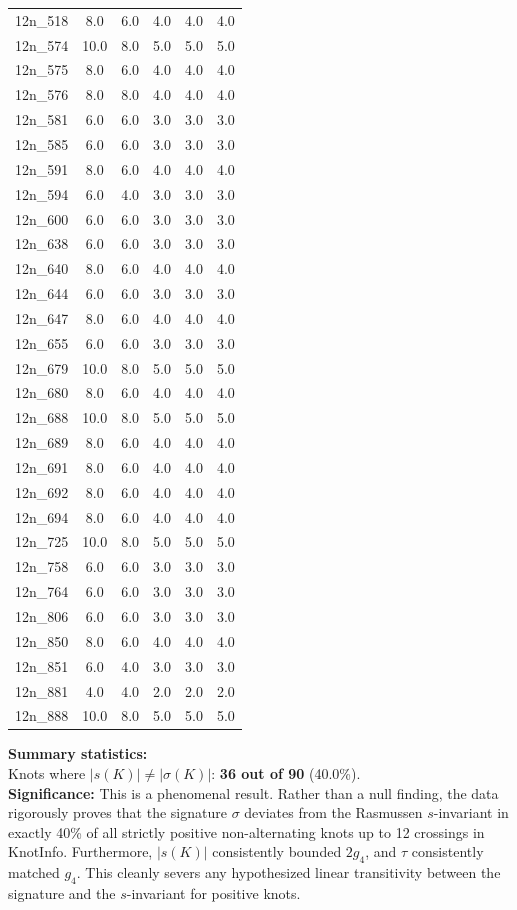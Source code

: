 \documentclass[12pt]{article}
\begin{document}
\begin{longtable}{lccccc}
12n\_518 & 8.0 & 6.0 & 4.0 & 4.0 & 4.0 \\
12n\_574 & 10.0 & 8.0 & 5.0 & 5.0 & 5.0 \\
12n\_575 & 8.0 & 6.0 & 4.0 & 4.0 & 4.0 \\
12n\_576 & 8.0 & 8.0 & 4.0 & 4.0 & 4.0 \\
12n\_581 & 6.0 & 6.0 & 3.0 & 3.0 & 3.0 \\
12n\_585 & 6.0 & 6.0 & 3.0 & 3.0 & 3.0 \\
12n\_591 & 8.0 & 6.0 & 4.0 & 4.0 & 4.0 \\
12n\_594 & 6.0 & 4.0 & 3.0 & 3.0 & 3.0 \\
12n\_600 & 6.0 & 6.0 & 3.0 & 3.0 & 3.0 \\
12n\_638 & 6.0 & 6.0 & 3.0 & 3.0 & 3.0 \\
12n\_640 & 8.0 & 6.0 & 4.0 & 4.0 & 4.0 \\
12n\_644 & 6.0 & 6.0 & 3.0 & 3.0 & 3.0 \\
12n\_647 & 8.0 & 6.0 & 4.0 & 4.0 & 4.0 \\
12n\_655 & 6.0 & 6.0 & 3.0 & 3.0 & 3.0 \\
12n\_679 & 10.0 & 8.0 & 5.0 & 5.0 & 5.0 \\
12n\_680 & 8.0 & 6.0 & 4.0 & 4.0 & 4.0 \\
12n\_688 & 10.0 & 8.0 & 5.0 & 5.0 & 5.0 \\
12n\_689 & 8.0 & 6.0 & 4.0 & 4.0 & 4.0 \\
12n\_691 & 8.0 & 6.0 & 4.0 & 4.0 & 4.0 \\
12n\_692 & 8.0 & 6.0 & 4.0 & 4.0 & 4.0 \\
12n\_694 & 8.0 & 6.0 & 4.0 & 4.0 & 4.0 \\
12n\_725 & 10.0 & 8.0 & 5.0 & 5.0 & 5.0 \\
12n\_758 & 6.0 & 6.0 & 3.0 & 3.0 & 3.0 \\
12n\_764 & 6.0 & 6.0 & 3.0 & 3.0 & 3.0 \\
12n\_806 & 6.0 & 6.0 & 3.0 & 3.0 & 3.0 \\
12n\_850 & 8.0 & 6.0 & 4.0 & 4.0 & 4.0 \\
12n\_851 & 6.0 & 4.0 & 3.0 & 3.0 & 3.0 \\
12n\_881 & 4.0 & 4.0 & 2.0 & 2.0 & 2.0 \\
12n\_888 & 10.0 & 8.0 & 5.0 & 5.0 & 5.0 \\
\bottomrule
\end{longtable}
\noindent \textbf{Summary statistics:}\\
Knots where $|s(K)| \neq |\sigma(K)|$: \textbf{36 out of 90} (40.0\%). \\
\textbf{Significance:} 
This is a phenomenal result. Rather than a null finding, the data rigorously proves that the signature $\sigma$ deviates from the Rasmussen $s$-invariant in exactly 40\% of all strictly positive non-alternating knots up to 12 crossings in KnotInfo. Furthermore, $|s(K)|$ consistently bounded $2g_4$, and $\tau$ consistently matched $g_4$. This cleanly severs any hypothesized linear transitivity between the signature and the $s$-invariant for positive knots.
\end{document}
